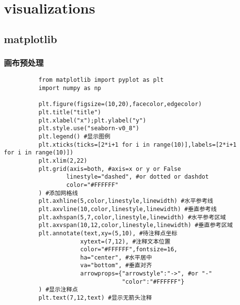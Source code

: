 \documentclass{article}
\begin{document}
  \section{visualizations}

    \subsection{matplotlib}
      \subsubsection{画布预处理}
        \begin{lstlisting}
          from matplotlib import pyplot as plt
          import numpy as np

          plt.figure(figsize=(10,20),facecolor,edgecolor)
          plt.title("title")
          plt.xlabel("x");plt.ylabel("y")
          plt.style.use("seaborn-v0_8")
          plt.legend() #显示图例
          plt.xticks(ticks=[2*i+1 for i in range(10)],labels=[2*i+1 for i in range(10)])
          plt.xlim(2,22)
          plt.grid(axis=both, #axis=x or y or False
                  linestyle="dashed", #or dotted or dashdot
                  color="#FFFFFF"
          ) #添加网格线
          plt.axhline(5,color,linestyle,linewidth) #水平参考线
          plt.axvline(10,color,linestyle,linewidth) #垂直参考线
          plt.axhspan(5,7,color,linestyle,linewidth) #水平参考区域
          plt.axvspan(10,12,color,linestyle,linewidth) #垂直参考区域
          plt.annotate(text,xy=(5,10), #待注释点坐标
                      xytext=(7,12), #注释文本位置
                      color="#FFFFFF",fontsize=16,
                      ha="center", #水平居中
                      va="bottom", #垂直对齐
                      arrowprops={"arrowstyle":"->", #or "-"
                                  "color":"#FFFFFF"}
          ) #显示注释点
          plt.text(7,12,text) #显示无箭头注释
        \end{lstlisting}
\end{document}
